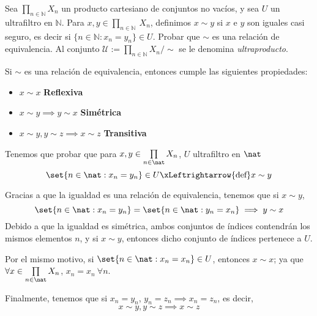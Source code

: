 \begin{problem}
Sea  $\prod_{n\in \mathbb{N}} X_n$ un producto cartesiano de conjuntos no vacíos, y sea $U$ un ultrafiltro en $\mathbb{N}$.
Para $x,y \in  \prod_{n\in \mathbb{N}}\ X_n$, definimos $x\sim y$ si $x$ e $y$ son iguales casi seguro, es
decir si $\{n\in \mathbb{N}: x_n = y_n\}\in U$. Probar que $\sim$ es una relación de equivalencia.
Al conjunto $\mathcal{U}:=\prod_{n\in \mathbb{N}} X_n/\sim$ se le denomina {\em ultraproducto}.

\solution

Si $\sim$ es una relación de equivalencia, entonces cumple las siguientes propiedades:
\begin{itemize}
	\item $x \sim x$ {\bf Reflexiva}
	\item $x \sim y \implies y \sim x$ {\bf Simétrica}
	\item $x \sim y, y \sim z \implies x \sim z$ {\bf Transitiva}
\end{itemize}

Tenemos que probar que para $x,y \in \prod\limits_{n \in \nat} X_n$, $U$ ultrafiltro en $\nat$
\[ \set{ n \in \nat : x_n = y_n} \in U \xLeftrightarrow{\text{def}} x \sim y \]

Gracias a que la igualdad es una relación de equivalencia, tenemos que si $x \sim y$,
\[\set{ n \in \nat : x_n = y_n} = \set{ n \in \nat : y_n = x_n} \implies y \sim x \]
Debido a que la igualdad es simétrica, ambos conjuntos de índices contendrán los mismos elementos $n$, y si $x\sim y$, entonces dicho conjunto de índices pertenece a $U$.

Por el mismo motivo, si $\set{ n \in \nat : x_n = x_n} \in U$, entonces $x \sim x$; ya que\\
$\forall x \in \prod\limits_{n \in \nat} X_n$, $x_n = x_n \ \forall n$.

Finalmente, tenemos que si $x_n = y_n$, $y_n = z_n \implies x_n = z_n$, es decir,
\[x \sim y, y \sim z \implies x \sim z\]

\end{problem}

